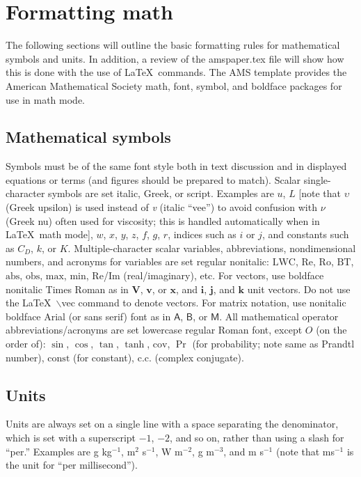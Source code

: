 \documentclass{ametsocV5}
\begin{document}
\section{Formatting math}
The following sections will outline the basic formatting rules for
mathematical symbols and units.  In addition, a review of the amspaper.tex
file will show how this is done with the use of \LaTeX\ commands.  The AMS
template provides the American Mathematical Society math, font, symbol, and
boldface packages for use in math mode.

\subsection{Mathematical symbols}
Symbols must be of the same font style both in text discussion and in
displayed equations or terms (and figures should be prepared to match).
Scalar single-character symbols are set italic, Greek, or script. Examples
are $u$, $L$ [note that $\upsilon$ (Greek upsilon) is used instead of
\textit{v} (italic ``vee'') to avoid confusion with $\nu$ (Greek nu) often
used for viscosity; this is handled automatically when in \LaTeX\ math mode],
$w$, $x$, $y$, $z$, $f$, $g$, $r$, indices such as $i$ or $j$, and constants
such as $C_D$, $k$, or $K$. Multiple-character scalar variables,
abbreviations, nondimensional numbers, and acronyms for variables are set
regular nonitalic: $\mathrm{LWC}$, $\mathrm{Re}$, $\mathrm{Ro}$,
$\mathrm{BT}$, $\mathrm{abs}$, $\mathrm{obs}$, $\mathrm{max}$,
$\mathrm{min}$, $\mathrm{Re}$/$\mathrm{Im}$ (real/imaginary), etc. For
vectors, use boldface nonitalic Times Roman as in $\mathbf{V}$, $\mathbf{v}$,
or $\mathbf{x}$, and $\mathbf{i}$, $\mathbf{j}$, and $\mathbf{k}$ unit
vectors. Do not use the \LaTeX\ $\backslash$vec command to denote vectors.
For matrix notation, use nonitalic boldface Arial (or sans serif) font as in
$\bm{\mathsf{A}}$, $\bm{\mathsf{B}}$, or $\bm{\mathsf{M}}$.  All mathematical
operator abbreviations/acronyms are set lowercase regular Roman font, except
$O$ (on the order of): $\sin$, $\cos$, $\tan$, $\tanh$, $\mathrm{cov}$, $\Pr$
(for probability; note same as Prandtl number), $\mathrm{const}$ (for
constant), $\mathrm{c.c.}$ (complex conjugate).

\subsection{Units}
Units are always set on a single line with a space separating the
denominator, which is set with a superscript $-1$, $-2$, and so on, rather
than using a slash for ``per.'' Examples are g kg$^{-1}$, m$^2$ s$^{-1}$, W
m$^{-2}$, g m$^{-3}$, and m s$^{-1}$ (note that ms$^{-1}$ is the unit for
``per millisecond'').
\end{document}
